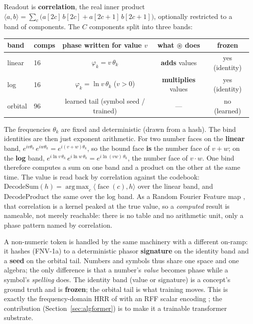 \documentclass[11pt]{article}
\DeclareMathOperator*{\argmax}{arg\,max}
\newcommand{\bind}{\mathbin{\circledast}}         %
\newcommand{\face}[1]{\operatorname{face}(#1)}
\begin{document}
Readout is \textbf{correlation}, the real inner product
$\langle a, b\rangle = \sum_c \big(a[2c]\,b[2c] + a[2c{+}1]\,b[2c{+}1]\big)$, optionally restricted to a
band of components. The $C$ components split into three bands:

\begin{center}
\begin{tabular}{@{}llccc@{}}
\toprule
band & comps & phase written for value $v$ & what $\bind$ does & frozen \\
\midrule
linear  & 16 & $\varphi_k = v\,\theta_k$              & \textbf{adds} values       & yes (identity) \\
log     & 16 & $\varphi_k = \ln v\,\theta_k$ ($v>0$)  & \textbf{multiplies} values & yes (identity) \\
orbital & 96 & learned tail (symbol seed / trained)  & ---                        & no (learned)   \\
\bottomrule
\end{tabular}
\end{center}

The frequencies $\theta_k$ are fixed and deterministic (drawn from a hash). The bind identities are then
just exponent arithmetic. For two number faces on the \textbf{linear} band,
$e^{i v \theta_k}\, e^{i w \theta_k} = e^{i (v+w)\theta_k}$, so the bound face \textbf{is} the number
face of $v+w$; on the \textbf{log} band,
$e^{i \ln v\,\theta_k}\, e^{i \ln w\,\theta_k} = e^{i \ln(vw)\,\theta_k}$, the number face of $v\cdot w$.
One bind therefore computes a sum on one band and a product on the other at the same time. The value is
read back by correlation against the codebook:
$\mathrm{DecodeSum}(h) = \argmax_c \langle \face{c}, h\rangle$ over the linear band, and
$\mathrm{DecodeProduct}$ the same over the log band. As a Random Fourier Feature map \parencite{rahimi2007random}, that correlation is a kernel peaked at the true value, so a \emph{computed} result is nameable,
not merely reachable: there is no table and no arithmetic unit, only a phase pattern named by
correlation.

A non-numeric token is handled by the same machinery with a different on-ramp: it hashes (FNV-1a) to a
deterministic phasor \textbf{signature} on the identity band and a \textbf{seed} on the orbital tail.
Numbers and symbols thus share one space and one algebra; the only difference is that a number's
\emph{value} becomes phase while a symbol's \emph{spelling} does. The identity band (value or signature)
is a concept's ground truth and is \textbf{frozen}; the orbital tail is what training moves. This is
exactly the frequency-domain HRR of \textcite{plate1994thesis,plate2003hrr} with an RFF scalar encoding \parencite{rahimi2007random}; the contribution (Section~\ref{sec:algformer}) is to make it a trainable transformer substrate.
\end{document}
